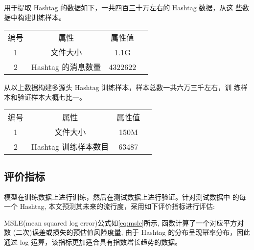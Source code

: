 用于提取 Hashtag 的数据如下，一共四百三十万左右的 Hashtag 数据，从这 些数据中构建训练样本。
\begin{table}[H]
    \centering
    \footnotesize%
      \label{tab:multi_h}
    \setlength{\tabcolsep}{30pt}%
    \renewcommand{\arraystretch}{1.2}%
    \begin{tabular}{cccc}
        \hline
       编号& 属性& 属性值 \\
        1 & 文件大小 & 1.1G\\
        2 & Hashtag 的消息数量 & 4322622\\
        \hline
        
        	\hline
    \end{tabular}

\end{table}
从以上数据构建多源头 Hashtag 训练样本，样本总数一共六万三千左右，训 练样本和验证样本大概七比一。

\begin{table}[H]
    \centering
    \footnotesize%
      \label{tab:sample_hashtag}
    \setlength{\tabcolsep}{30pt}%
    \renewcommand{\arraystretch}{1.2}%
    \begin{tabular}{cccc}
        \hline
        编号 & 属性 & 属性值\\
        1 & 文件大小& 150M\\
        2 &Hashtag 训练样本数目& 63487\\
        \hline
        
        	\hline
    \end{tabular}

\end{table}

\subsection{评价指标}
模型在训练数据上进行训练，然后在测试数据上进行验证。针对测试数据中
的每一个 Hashtag, 本文预测其未来的流行度，采用如下评价指标进行评估:

 MSLE(mean squared log error)公式如\ref{eq:msle}所示, 函数计算了一个对应平方对数 (二次)误差或损失的预估值风险度量, 由于 Hashtag 的分布呈现幂率分布，因此
通过 log 运算，该指标更加适合具有指数增长趋势的数据。 

